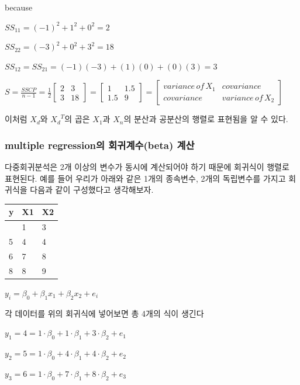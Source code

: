 \documentclass[
]{book}
\begin{document}
because

\(SS_{11}=(-1)^2+1^2+0^2=2\)

\(SS_{22}=(-3)^2+0^2+3^2=18\)

\(SS_{12}=SS_{21}=(-1)(-3)+(1)(0)+(0)(3)=3\)

\(S=\frac{SSCP}{n-1}=\frac{1}{2}\begin{bmatrix}
2 & 3\\
3 & 18
\end{bmatrix}=\begin{bmatrix}
1 & 1.5\\
1.5 & 9
\end{bmatrix}=\begin{bmatrix}
variance\, of \, X_{1} & covariance\\
 covariance&variance\, of\, X_{2}
\end{bmatrix}\)

이처럼 \(X_{d}\)와 \({X_{d}}^T\)의 곱은 \(X_{1}\)과 \(X_{n}\)의 분산과 공분산의 행렬로 표현됨을 알 수 있다.

\subsubsection{multiple regression의 회귀계수(beta) 계산}\label{multiple-regressionuxc758-uxd68cuxadc0uxacc4uxc218beta-uxacc4uxc0b0-1}

다중회귀분석은 2개 이상의 변수가 동시에 계산되어야 하기 때문에 회귀식이 행렬로 표현된다. 예를 들어 우리가 아래와 같은 1개의 종속변수, 2개의 독립변수를 가지고 회귀식을 다음과 같이 구성했다고 생각해보자.

\begin{longtable}[]{@{}lll@{}}
\toprule\noalign{}
y & X1 & X2 \\
\midrule\noalign{}
\endhead
\bottomrule\noalign{}
\endlastfoot
4 & 1 & 3 \\
5 & 4 & 4 \\
6 & 7 & 8 \\
8 & 8 & 9 \\
\end{longtable}

\(y_{i}=\beta_{0}+\beta_{1}x_{1}+\beta_{2}x_{2}+e_{i}\)

각 데이터를 위의 회귀식에 넣어보면 총 4개의 식이 생긴다

\(y_{1}=4=1\cdot \beta_{0}+1\cdot \beta_{1}+3\cdot \beta_{2}+e_{1}\)

\(y_{2}=5=1\cdot \beta_{0}+4\cdot \beta_{1}+4\cdot \beta_{2}+e_{2}\)

\(y_{3}=6=1\cdot \beta_{0}+7\cdot \beta_{1}+8\cdot \beta_{2}+e_{3}\)
\end{document}
